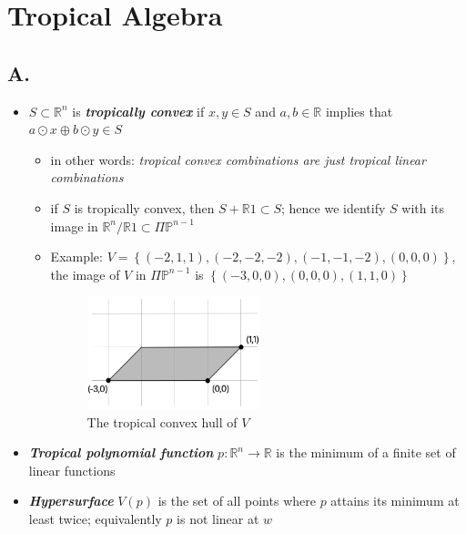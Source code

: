 \documentclass{article}
\begin{document}
\section*{Tropical Algebra}

\subsection*{A.}

\begin{itemize}
	\item \( S \subset \mathbb{R}^n \) is \textbf{\textit{tropically convex}} if \( x,y \in S \) and \( a,b \in \mathbb{R} \) implies that \( a \odot x \oplus b \odot y \in S \)
	\begin{itemize}
		\item in other words: \emph{tropical convex combinations are just tropical linear combinations}
		\item if \( S \) is tropically convex, then \( S + \mathbb{R} 1 \subset S \); hence we identify \( S \) with its image in \( \mathbb{R}^n / \mathbb{R}1 \subset \Pi \mathbb{P}^{n-1} \)
  	\item Example: \( V = \left\{ (-2,1,1), (-2,-2,-2), (-1,-1,-2), (0,0,0) \right\} \), the image of \( V \) in \( \Pi \mathbb{P}^{n-1} \) is \( \left\{ (-3,0,0), (0,0,0), (1,1, 0) \right\} \)
   
		\begin{figure}[H]
			\centering
			\includegraphics[width=5cm]{graphics/convex_hull_1.jpg}
			\caption{The tropical convex hull of \( V \)}
		\end{figure}
	\end{itemize}

	\item \textbf{\textit{Tropical polynomial function}} \( p: \mathbb{R}^n \to \mathbb{R} \) is the minimum of a finite set of linear functions 
 	\item \textbf{\textit{Hypersurface}} \( V(p) \) is the set of all points where \( p \) attains its minimum at least twice; equivalently \( p \) is not linear at \( w \)
 
\end{itemize}
\end{document}
